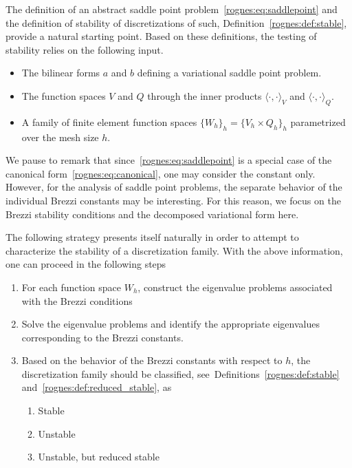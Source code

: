 The definition of an abstract saddle point
problem~\eqref{rognes:eq:saddlepoint} and the definition of stability
of discretizations of such, Definition~\ref{rognes:def:stable},
provide a natural starting point. Based on these definitions, the
testing of stability relies on the following input.
\begin{itemize}
\item The bilinear forms $a$ and $b$ defining a variational
  saddle point problem.
\item The function spaces $V$ and $Q$ through the inner products
  $\langle \cdot, \cdot \rangle_{V}$ and $\langle \cdot, \cdot
  \rangle_{Q}$.
\item A family of finite element function spaces $\{W_h\}_h = \{V_h
  \times Q_h \}_h$ parametrized over the mesh size $h$.
\end{itemize}
We pause to remark that since~\eqref{rognes:eq:saddlepoint} is a
special case of the canonical form~\eqref{rognes:eq:canonical}, one
may consider the
\babuska{} constant only. However, for the analysis of saddle point
problems, the separate behavior of the individual Brezzi constants
may be interesting. For this reason, we focus on the Brezzi stability
conditions and the decomposed variational form here.

The following strategy presents itself naturally in order to attempt
to characterize the stability of a discretization family. With the
above information, one can proceed in the following steps
\begin{enumerate}
\item For each function space $W_h$, construct the eigenvalue problems
  associated with the Brezzi conditions
\item Solve the eigenvalue problems and identify the appropriate
  eigenvalues corresponding to the Brezzi constants.
\item Based on the behavior of the Brezzi constants with respect to
  $h$, the discretization family should be classified,
  see~Definitions~\ref{rognes:def:stable}
  and~\ref{rognes:def:reduced_stable}, as
  \begin{enumerate}
  \item Stable
  \item Unstable
  \item Unstable, but reduced stable
  \end{enumerate}
\end{enumerate}

